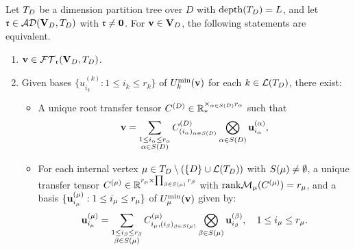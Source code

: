 \begin{theorem}
\label{thm:TBT_characterisation}
Let $T_D$ be a dimension partition tree over $D$ with $\mathrm{depth}(T_D) = L$,
and let $\mathfrak{r} \in \mathcal{AD}(\mathbf{V}_D,T_D)$ with $\mathfrak{r} \neq \mathbf{0}$.
For $\mathbf{v} \in \mathbf{V}_D$, the following statements are equivalent.
\begin{enumerate}
\item[\textup{(a)}] $\mathbf{v} \in \mathcal{FT}_{\mathfrak{r}}(\mathbf{V}_D,T_D)$.
\item[\textup{(b)}] Given bases $\{u^{(k)}_{i_k} : 1 \leq i_k \leq r_k\}$
    of $U^{\min}_{k}(\mathbf{v})$ for each $k \in \mathcal{L}(T_D)$, there exist:
    \begin{itemize}
    \item A unique root transfer tensor $C^{(D)} \in
        \mathbb{R}^{\times_{\alpha \in S(D)} r_\alpha}_*$ such that
        \begin{equation}
        \label{eq:TBT_root}
            \mathbf{v} = \sum_{\substack{1 \leq i_\alpha \leq r_\alpha \\ \alpha \in S(D)}}
            C^{(D)}_{(i_\alpha)_{\alpha \in S(D)}}
            \bigotimes_{\alpha \in S(D)} \mathbf{u}^{(\alpha)}_{i_\alpha},
        \end{equation}
    \item For each internal vertex $\mu \in T_D \setminus (\{D\} \cup \mathcal{L}(T_D))$
        with $S(\mu) \neq \emptyset$, a unique transfer tensor
        $C^{(\mu)} \in \mathbb{R}^{r_\mu \times \prod_{\beta \in S(\mu)} r_\beta}$
        with $\mathrm{rank} \mathcal{M}_{\mu}(C^{(\mu)}) = r_\mu$, and a basis
        $\{\mathbf{u}^{(\mu)}_{i_\mu} : 1 \leq i_\mu \leq r_\mu\}$ of
        $U^{\min}_{\mu}(\mathbf{v})$ given by:
        \begin{equation}
        \label{eq:TBT_transfer}
            \mathbf{u}^{(\mu)}_{i_\mu}
            = \sum_{\substack{1 \leq i_\beta \leq r_\beta \\ \beta \in S(\mu)}}
            C^{(\mu)}_{i_\mu, (i_\beta)_{\beta \in S(\mu)}}
            \bigotimes_{\beta \in S(\mu)} \mathbf{u}^{(\beta)}_{i_\beta},
            \quad 1 \leq i_\mu \leq r_\mu.
        \end{equation}
    \end{itemize}
\end{enumerate}
\end{theorem}

